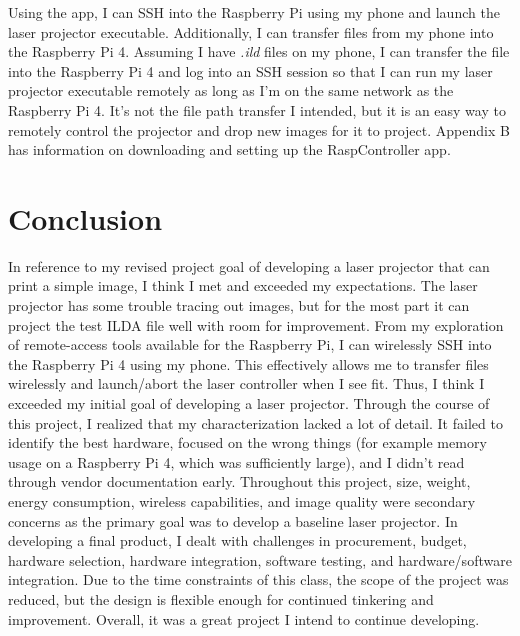 \documentclass[journal]{IEEEtran}
\begin{document}
    Using the app, I can SSH into the Raspberry Pi using my phone and launch the laser projector executable. 
    Additionally, I can transfer files from my phone into the Raspberry Pi 4.
    Assuming I have \emph{.ild} files on my phone, I can transfer the file into the Raspberry Pi 4 and log into an SSH session so that I can run my laser projector executable remotely as long as I'm on the same network as the Raspberry Pi 4.
    It's not the file path transfer I intended, but it is an easy way to remotely control the projector and drop new images for it to project. 
    Appendix B has information on downloading and setting up the RaspController app.
     
    \section{Conclusion}

    In reference to my revised project goal of developing a laser projector that can print a simple image, I think I met and exceeded my expectations.
    The laser projector has some trouble tracing out images, but for the most part it can project the test ILDA file well with room for improvement.
    From my exploration of remote-access tools available for the Raspberry Pi, I can wirelessly SSH into the Raspberry Pi 4 using my phone.
    This effectively allows me to transfer files wirelessly and launch/abort the laser controller when I see fit.
    Thus, I think I exceeded my initial goal of developing a laser projector.
    Through the course of this project, I realized that my characterization lacked a lot of detail.
    It failed to identify the best hardware, focused on the wrong things (for example memory usage on a Raspberry Pi 4, which was sufficiently large), and I didn't read through vendor documentation early.
    Throughout this project, size, weight, energy consumption, wireless capabilities, and image quality were secondary concerns as the primary goal was to develop a baseline laser projector.
    In developing a final product, I dealt with challenges in procurement, budget, hardware selection, hardware integration, software testing, and hardware/software integration. 
    Due to the time constraints of this class, the scope of the project was reduced, but the design is flexible enough for continued tinkering and improvement.
    Overall, it was a great project I intend to continue developing.

    \nocite{*}
    \newpage

    
    
\end{document}
